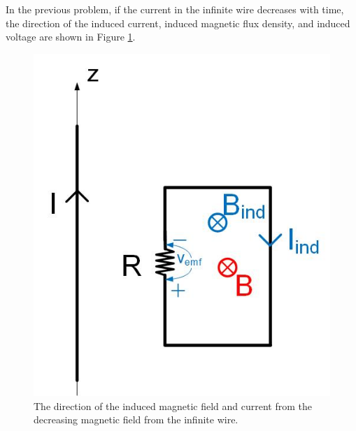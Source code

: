 \documentclass{ximera}
\begin{document}
\begin{example}

In the previous problem, if the current in the infinite wire decreases with time, the direction of the induced current, induced magnetic flux density, and induced voltage are shown in Figure \ref{fig:LenzLaw2}.



\begin{figure}[htbp]
\begin{center}
\includegraphics[scale=0.5]{../jpg/Lenzlaw2.jpg}
\end{center}
\caption{The direction of the induced magnetic field and current from the decreasing magnetic field from the infinite wire.}
\label{fig:LenzLaw2}
\end{figure}


\end{example}
\end{document}
